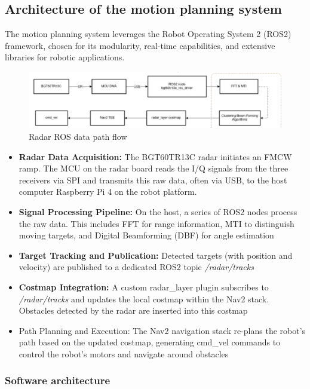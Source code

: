 \subsection{Architecture of the motion planning system}
The motion planning system leverages the Robot Operating System 2 (ROS2) framework, chosen for its modularity, real-time capabilities, and extensive libraries for robotic applications.
\begin{figure}[H]
    \centering
    \includegraphics[width=1\linewidth]{Src/images/Algorthm.png}
    \caption{Radar ROS data path flow}
    \label{fig:radar_ros}
\end{figure}
\begin{itemize}
    \item \textbf{Radar Data Acquisition:} The BGT60TR13C radar initiates an FMCW ramp. The MCU on the radar board reads the I/Q signals from the three receivers via SPI and transmits this raw data, often via USB, to the host computer Raspberry Pi 4 on the robot platform.
    \item \textbf{Signal Processing Pipeline:} On the host, a series of ROS2 nodes process the raw data. This includes FFT for range information, MTI to distinguish moving targets, and Digital Beamforming (DBF) for angle estimation
    \item \textbf{Target Tracking and Publication:} Detected targets (with position and velocity) are published to a dedicated ROS2 topic \textit{/radar/tracks}
    \item \textbf{Costmap Integration:} A custom radar\_layer plugin subscribes to \textit{/radar/tracks} and updates the local costmap within the Nav2 stack. Obstacles detected by the radar are inserted into this costmap
    \item Path Planning and Execution: The Nav2 navigation stack re-plans the robot's path based on the updated costmap, generating cmd\_vel commands to control the robot's motors and navigate around obstacles
\end{itemize}
\subsubsection{Software architecture}

